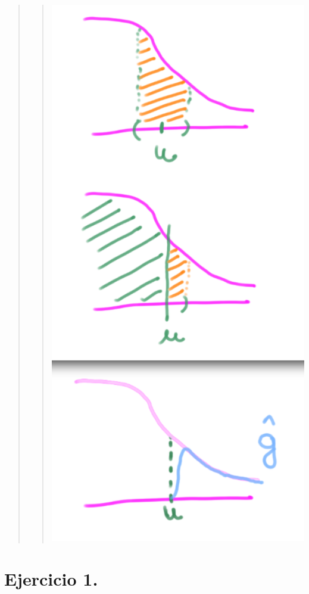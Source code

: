 \documentclass[
]{article}
\begin{document}
\begin{quote}
\begin{quote}
\includegraphics{../Imagenes/intro.png}
\end{quote}
\end{quote}

\hypertarget{ejercicio-1.}{%
\section{Ejercicio 1.}\label{ejercicio-1.}}
\end{document}
